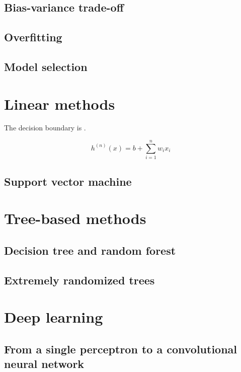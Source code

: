 \subsection{Bias-variance trade-off}

\subsection{Overfitting}

\subsection{Model selection}

\section{Linear methods}

The decision boundary is . 

\begin{equation}
h^(n)(x) = b + \sum_{i=1}^n w_i x_i 
\end{equation} 

\subsection{Support vector machine}

\section{Tree-based methods}

\subsection{Decision tree and random forest}

\subsection{Extremely randomized trees}

\section{Deep learning}

\subsection{From a single perceptron to a convolutional neural network}

